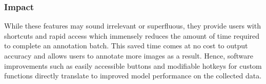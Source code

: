 \subsubsection{Impact}
While these features may sound irrelevant or superfluous, they provide users with shortcuts and rapid access which immensely reduces the amount of time required to complete an annotation batch. This saved time comes at no cost to output accuracy and allows users to annotate more images as a result. Hence, software improvements such as easily accessible buttons and modifiable hotkeys for custom functions directly translate to improved model performance on the collected data.
